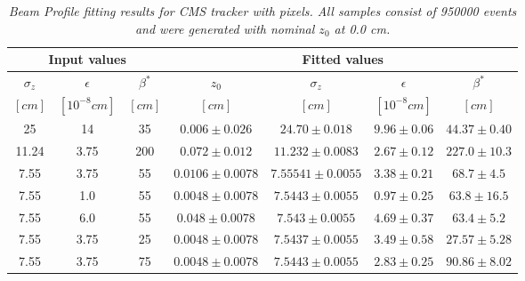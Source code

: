 \documentclass{cmspaper}
\begin{document}
\begin{table} [th]
\caption{\it \label{BetaFitResult} Beam Profile fitting results for CMS tracker with pixels. All samples consist of 950000 events and 
were generated with nominal $z_0$ at 0.0 cm.}
\begin{center}
\begin{tabular}{|c|c|c|c|c|c|c|} \hline
\multicolumn{3}{|c|}{Input values}& \multicolumn{4}{|c|}{Fitted  values}\\ \hline
$\sigma_z$&$\epsilon$    &$\beta^*$  &   $z_0$&$\sigma_z$ &$\epsilon$   &$\beta^*$\\
$[cm]$    &$[10^{-8}cm]$ &$[cm]$     &$[cm]$  &$[cm]$     &$[10^{-8}cm]$&$[cm]$\\
 \hline      
\hline
 25   & 14   & 35 &$0.006  \pm 0.026$  &$24.70  \pm 0.018$   &$9.96 \pm 0.06$   & $44.37\pm 0.40$
\\ \hline
 11.24& 3.75 & 200&$0.072  \pm 0.012$  &$11.232 \pm 0.0083$  &$2.67  \pm 0.12$    & $227.0\pm 10.3$ 
\\ \hline
 7.55 & 3.75 & 55 &$0.0106 \pm 0.0078$ &$7.55541 \pm 0.0055$  &$3.38  \pm 0.21$    & $68.7\pm 4.5$
\\ \hline
 7.55 & 1.0  & 55 &$0.0048 \pm 0.0078$ &$7.5443  \pm 0.0055$  &$0.97  \pm 0.25$    & $63.8\pm  16.5$
\\\hline
 7.55 & 6.0  & 55 &$  0.048 \pm0.0078$ &$7.543\pm 0.0055$  &$4.69\pm 0.37$    & $63.4\pm  5.2$
\\ \hline
 7.55 & 3.75 & 25 &$0.0048 \pm 0.0078$ &$7.5437  \pm 0.0055$  &$3.49  \pm 0.58$    & $27.57\pm 5.28$
\\\hline
 7.55 & 3.75 & 75 &$0.0048 \pm 0.0078$ & $7.5443  \pm 0.0055$  &$2.83  \pm 0.25$    & $90.86\pm 8.02$
\\ \hline 
\end{tabular}
\end{center}

\end{table}
\end{document}
